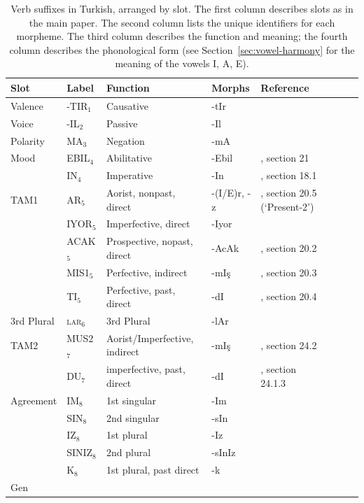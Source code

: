 \documentclass[11pt,letterpaper]{article}
\begin{document}
\begin{table}
\begin{tabular}{llllllll}
Slot & Label & Function & Morphs & Reference \\ \hline
\hline
	Valence & -TIR$_1$  & Causative & -tIr & \\
\hline
	Voice &  -IL$_2$ & Passive & -Il\\
\hline
Polarity  & MA$_3$ & Negation & -mA \\
\hline
Mood  & EBIL$_4$ & Abilitative & -Ebil & \cite{schaaik2020turkish}, section 21 \\
      & IN$_4$   & Imperative & -In & \cite{schaaik2020turkish}, section 18.1 \\
\hline
TAM1      & AR$_5$ & Aorist, nonpast, direct & -(I/E)r, -z  & \cite{schaaik2020turkish}, section 20.5 (`Present-2') \\
          & IYOR$_5$ & Imperfective, direct & -Iyor \\
          & ACAK$_5$ & Prospective, nopast, direct & -AcAk & \cite{schaaik2020turkish}, section 20.2\\
          & MIS1$_5$  & Perfective, indirect & -mIş & \cite{schaaik2020turkish}, section 20.3\\
          & TI$_5$ & Perfective, past, direct & -dI & \cite{schaaik2020turkish}, section 20.4\\
\hline
	3rd Plural& \textsc{lar}$_{6}$  & 3rd Plural & -lAr & \\
\hline
TAM2      & MUS2$_7$ & Aorist/Imperfective, indirect & -mIş & \cite{schaaik2020turkish}, section 24.2 \\
          & DU$_7$ & imperfective, past, direct & -dI & \cite{schaaik2020turkish}, section 24.1.3 \\
\hline
	Agreement & IM$_8$ & 1st singular & -Im\\
	  & SIN$_8$ &2nd singular & -sIn\\
	  & IZ$_8$  & 1st plural & -Iz\\
	  & SINIZ$_8$ & 2nd plural & -sInIz \\
	  & K$_8$     & 1st plural, past direct & -k\\
\hline
Gen & \\
\hline
\end{tabular}
	\caption{Verb suffixes in Turkish, arranged by slot. The first column describes slots as in the main paper. The second column lists the unique identifiers for each morpheme. The third column describes the function and meaning; the fourth column describes the phonological form (see Section~\ref{sec:vowel-harmony} for the meaning of the vowels I, A, E).}\label{tab:turkish-suffixes}
\end{table}
\end{document}
